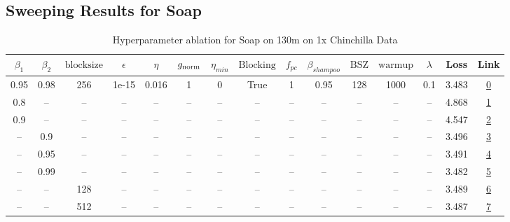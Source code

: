 \subsection{Sweeping Results for Soap}%
\begin{table}[H]
\centering
\caption{Hyperparameter ablation for Soap on 130m on 1x Chinchilla Data}
\label{tab:ablation_soap_130m_on_1x_chinchilla_data}
\begin{tabular}{ccccccccccccccc}
\toprule
$\beta_1$ & $\beta_2$ & $\mathrm{block size}$ & $\epsilon$ & $\eta$ & $g_{\mathrm{norm}}$ & $\eta_{min}$ & $\mathrm{Blocking}$ & $f_{pc}$ & $\beta_{shampoo}$ & $\mathrm{BSZ}$ & $\mathrm{warmup}$ & $\lambda$ & Loss & Link \\
\midrule
0.95 & 0.98 & 256 & 1e-15 & 0.016 & 1 & 0 & True & 1 & 0.95 & 128 & 1000 & 0.1 & 3.483 & \href{https://wandb.ai/marin-community/optimizer-scaling/runs/sweep-130m-2B-soaplff7de8lr0.016-wd0.1-minlr0-warmup1000-b10.95--f08df8}{0} \\
\midrule
0.8 & -- & -- & -- & -- & -- & -- & -- & -- & -- & -- & -- & -- & 4.868 & \href{https://wandb.ai/marin-community/optimizer-scaling/runs/sweep-130m-2B-soapl0e72d4lr0.016-wd0.1-minlr0-warmup1000-b10.8-b-24a77a}{1} \\
0.9 & -- & -- & -- & -- & -- & -- & -- & -- & -- & -- & -- & -- & 4.547 & \href{https://wandb.ai/marin-community/optimizer-scaling/runs/sweep-130m-2B-soaplf498b0lr0.016-wd0.1-minlr0-warmup1000-b10.9-b-a0623f}{2} \\
-- & 0.9 & -- & -- & -- & -- & -- & -- & -- & -- & -- & -- & -- & 3.496 & \href{https://wandb.ai/marin-community/optimizer-scaling/runs/sweep-130m-2B-soaple0af61lr0.016-wd0.1-minlr0-warmup1000-b10.95--e189bd}{3} \\
-- & 0.95 & -- & -- & -- & -- & -- & -- & -- & -- & -- & -- & -- & 3.491 & \href{https://wandb.ai/marin-community/optimizer-scaling/runs/sweep-130m-2B-soapl8015a9lr0.016-wd0.1-minlr0-warmup1000-b10.95--a9e9d5}{4} \\
-- & 0.99 & -- & -- & -- & -- & -- & -- & -- & -- & -- & -- & -- & 3.482 & \href{https://wandb.ai/marin-community/optimizer-scaling/runs/sweep-130m-2B-soapla4071flr0.016-wd0.1-minlr0-warmup1000-b10.95--f307f3}{5} \\
-- & -- & 128 & -- & -- & -- & -- & -- & -- & -- & -- & -- & -- & 3.489 & \href{https://wandb.ai/marin-community/optimizer-scaling/runs/sweep-130m-2B-soaplc51c66lr0.016-wd0.1-minlr0-warmup1000-b10.95--a8e71b}{6} \\
-- & -- & 512 & -- & -- & -- & -- & -- & -- & -- & -- & -- & -- & 3.487 & \href{https://wandb.ai/marin-community/optimizer-scaling/runs/sweep-130m-2B-soapl55f9b8lr0.016-wd0.1-minlr0-warmup1000-b10.95--e77aea}{7} \\

\end{tabular}
\end{table}
